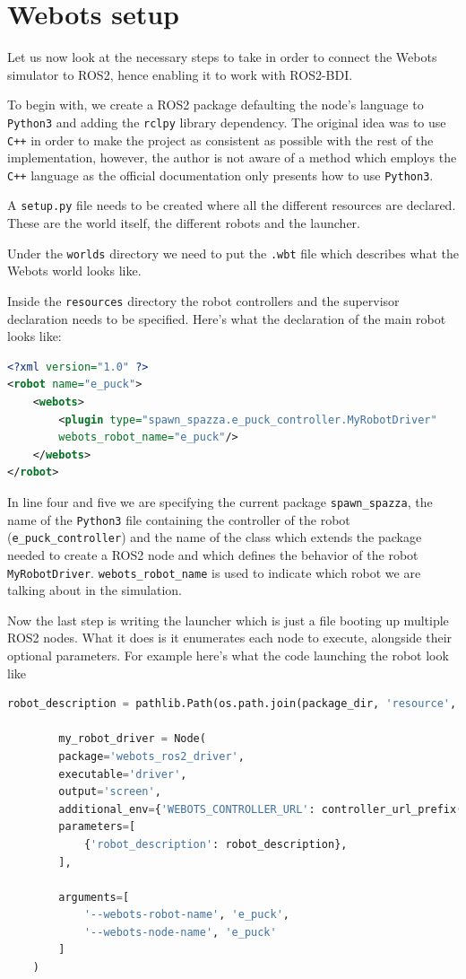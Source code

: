 \section{Webots setup} Let us now look at the necessary steps to take in order to connect the Webots simulator to ROS2, hence enabling it to work with ROS2-BDI.
\par
To begin with, we create a ROS2 package defaulting the node's language to \texttt{Python3} and adding the \texttt{rclpy} library dependency. The original idea was to use \texttt{C++} in order to make the project as consistent as possible with the rest of the implementation, however, the author is not aware of a method which employs the \texttt{C++} language as the official documentation only presents how to use \texttt{Python3}.
\par
A \texttt{setup.py} file needs to be created where all the different resources are declared. These are the world itself, the different robots and the launcher.
\par
Under the \texttt{worlds} directory we need to put the \texttt{.wbt} file which describes what the Webots world looks like.
\par
Inside the \texttt{resources} directory the robot controllers and the supervisor declaration needs to be specified. Here's what the declaration of the main robot looks like: 
\begin{lstlisting}[language=XML, caption=XML file linking robot controller to Webots]
<?xml version="1.0" ?>
<robot name="e_puck">
    <webots>
        <plugin type="spawn_spazza.e_puck_controller.MyRobotDriver" 
        webots_robot_name="e_puck"/>
    </webots>
</robot>
\end{lstlisting}
In line four and five we are specifying the current package \texttt{spawn\_spazza}, the name of the \texttt{Python3} file containing the controller of the robot (\texttt{e\_puck\_controller}) and the name of the class which extends the package needed to create a ROS2 node and which defines the behavior of the robot \texttt{MyRobotDriver}. \texttt{webots\_robot\_name} is used to indicate which robot we are talking about in the simulation.
\par
Now the last step is writing the launcher which is just a file booting up multiple ROS2 nodes. What it does is it enumerates each node to execute, alongside their optional parameters. For example here's what the code launching the robot look like
\begin{lstlisting}[language=Python, caption=launch description for a Webots robot]
        robot_description = pathlib.Path(os.path.join(package_dir, 'resource', 'e_puck.urdf')).read_text()

        my_robot_driver = Node(
        package='webots_ros2_driver',
        executable='driver',
        output='screen',
        additional_env={'WEBOTS_CONTROLLER_URL': controller_url_prefix() + 'e_puck'},
        parameters=[
            {'robot_description': robot_description},
        ],  

        arguments=[
            '--webots-robot-name', 'e_puck',
            '--webots-node-name', 'e_puck'
        ]
    )
\end{lstlisting}

